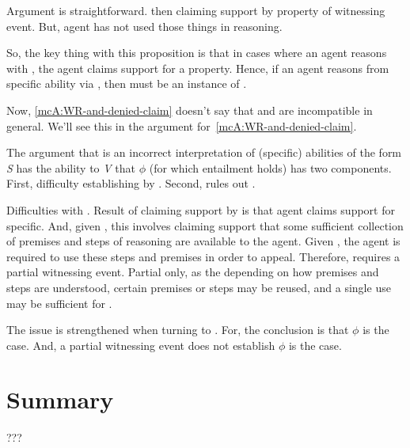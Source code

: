 \begin{note}
  Argument is straightforward.
  \adB{} then claiming support by property of witnessing event.
  But, agent has not used those things in reasoning.
\end{note}

\begin{note}
  So, the key thing with this proposition is that in cases where an agent reasons with , the agent claims support for a property.
  Hence, if an agent reasons from specific ability via , then must be an instance of \AR{}.

  Now, \autoref{mcA:WR-and-denied-claim} doesn't say that \ESU{} and \WR{} are incompatible in general.
  We'll see this in the argument for~\autoref{mcA:WR-and-denied-claim}.

  The argument that \WR{} is an incorrect interpretation of (specific) abilities of the form \emph{S} has the ability to \emph{V} that \(\phi\) (for which  entailment holds) has two components.
  First, difficulty establishing by \gsi{}.
  Second, rules out .

  Difficulties with \gsi{}.
  Result of claiming support by \gsi{} is that agent claims support for specific.
  And, given \WR{}, this involves claiming support that some sufficient collection of premises and steps of reasoning are available to the agent.
  Given \ESU{}, the agent is required to use these steps and premises in order to appeal.
  Therefore, \ESU{} requires a partial witnessing event.
  Partial only, as the depending on how premises and steps are understood, certain premises or steps may be reused, and a single use may be sufficient for \ESU{}.

  The issue is strengthened when turning to .
  For, the conclusion is that \(\phi\) is the case.
  And, a partial witnessing event does not establish \(\phi\) is the case.
\end{note}

\section{Summary}
\label{sec:uRa-and-wr-summary}

\begin{note}[Table]
  \begin{figure}[H]
    \centering
    \saMtxRuledOutESU{}
  \end{figure}
\end{note}

\begin{note}[Summarising]
  ???
\end{note}

